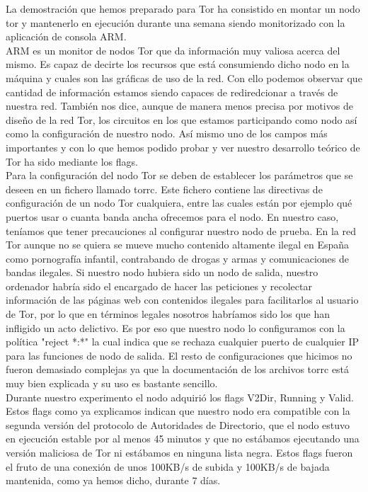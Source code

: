 La demostración que hemos preparado para Tor ha consistido en montar un nodo tor y mantenerlo en ejecución durante una semana siendo monitorizado con la aplicación de consola ARM.\\
ARM es un monitor de nodos Tor que da información muy valiosa acerca del mismo. Es capaz de decirte los recursos que está consumiendo dicho nodo en la máquina y cuales son las gráficas de uso de la red. Con ello podemos observar que cantidad de información estamos siendo capaces de rediredcionar a través de nuestra red. También nos dice, aunque de manera menos precisa por motivos de diseño de la red Tor, los circuitos en los que estamos participando como nodo así como la configuración de nuestro nodo. Así mismo uno de los campos más importantes y con lo que hemos podido probar y ver nuestro desarrollo teórico de Tor ha sido mediante los flags.\\
Para la configuración del nodo Tor se deben de establecer los parámetros que se deseen en un fichero llamado torrc. Este fichero contiene las directivas de configuración de un nodo Tor cualquiera, entre las cuales están por ejemplo qué puertos usar o cuanta banda ancha ofrecemos para el nodo. En nuestro caso, teníamos que tener precauciones al configurar nuestro nodo de prueba. En la red Tor aunque no se quiera se mueve mucho contenido altamente ilegal en España como pornografía infantil, contrabando de drogas y armas y comunicaciones de bandas ilegales. Si nuestro nodo hubiera sido un nodo de salida, nuestro ordenador habría sido el encargado de hacer las peticiones y recolectar información de las páginas web con contenidos ilegales para facilitarlos al usuario de Tor, por lo que en términos legales nosotros habríamos sido los que han infligido un acto delictivo. Es por eso que nuestro nodo lo configuramos con la política "reject *:*" la cual indica que se rechaza cualquier puerto de cualquier IP para las funciones de nodo de salida. El resto de configuraciones que hicimos no fueron demasiado complejas ya que la documentación de los archivos torrc está muy bien explicada y su uso es bastante sencillo.\\
Durante nuestro experimento el nodo adquirió los flags V2Dir, Running y Valid. Estos flags como ya explicamos indican que nuestro nodo era compatible con la segunda versión del protocolo de Autoridades de Directorio, que el nodo estuvo en ejecución estable por al menos 45 minutos y que no estábamos ejecutando una versión maliciosa de Tor ni estábamos en ninguna lista negra. Estos flags fueron el fruto de una conexión de unos 100KB/s de subida y 100KB/s de bajada mantenida, como ya hemos dicho, durante 7 días.\\
